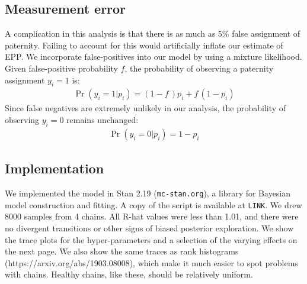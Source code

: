 \documentclass[reqno ,12pt]{amsart}
\begin{document}
\subsection*{Measurement error}

A complication in this analysis is that there is as much as 5\% false assignment of paternity. Failing to account for this would artificially inflate our estimate of EPP. We incorporate false-positives into our model by using a mixture likelihood. Given false-positive probability $f$, the probability of observing a paternity assignment $y_i=1$ is:
\begin{align*}
	\Pr( y_i=1 | p_i ) = (1-f\,) p_i + f\, (1 - p_i)
\end{align*}
Since false negatives are extremely unlikely in our analysis, the probability of observing $y_i=0$ remains unchanged:
\begin{align*}
	\Pr( y_i=0 | p_i ) = 1 - p_i
\end{align*}

\subsection*{Implementation}

We implemented the model in Stan 2.19 (\texttt{mc-stan.org}), a library for Bayesian model construction and fitting. A copy of the script is available at \texttt{LINK}. We drew 8000 samples from 4 chains. All R-hat values were less than 1.01, and there were no divergent transitions or other signs of biased posterior exploration. We show the trace plots for the hyper-parameters and a selection of the varying effects on the next page. We also show the same traces as rank histograms (https://arxiv.org/abs/1903.08008), which make it much easier to spot problems with chains. Healthy chains, like these, should be relatively uniform.
\end{document}
